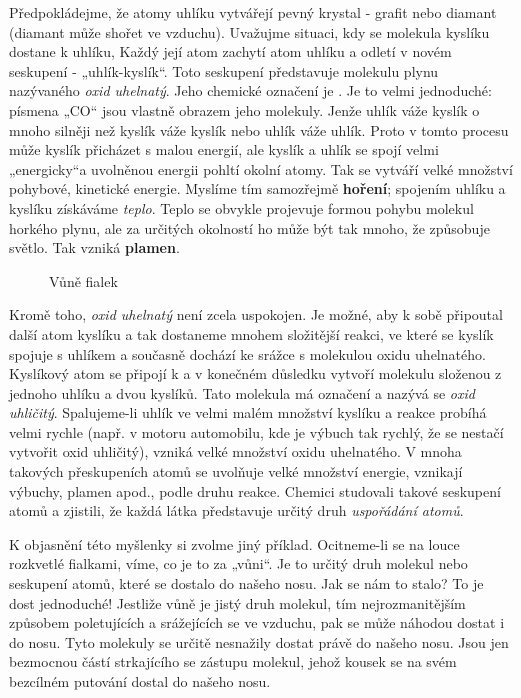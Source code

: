     Předpokládejme, že atomy uhlíku vytvářejí pevný krystal - grafit nebo diamant (diamant může
    shořet ve vzduchu). Uvažujme situaci, kdy se molekula kyslíku dostane k uhlíku, Každý její atom
    zachytí atom uhlíku a odletí v novém seskupení - „uhlík-kyslík“. Toto seskupení představuje
    molekulu plynu nazývaného \emph{oxid uhelnatý}. Jeho chemické označení je . Je to velmi
    jednoduché: písmena „CO“ jsou vlastně obrazem jeho molekuly. Jenže uhlík váže kyslík o mnoho
    silněji než kyslík váže kyslík nebo uhlík váže uhlík. Proto v tomto procesu může kyslík
    přicházet s malou energií, ale kyslík a uhlík se spojí velmi „energicky“a uvolněnou energii
    pohltí okolní atomy. Tak se vytváří velké množství pohybové, kinetické energie. Myslíme tím
    samozřejmě \textbf{hoření}; spojením uhlíku a kyslíku získáváme \emph{teplo}. Teplo se obvykle
    projevuje formou pohybu molekul horkého plynu, ale za určitých okolností ho může být tak mnoho,
    že způsobuje světlo. Tak vzniká \textbf{plamen}.
    
    \begin{figure}[hbt!]    %
      \centering
      \caption{Vůně fialek \cite[s.~24]{Feynman01}}
      \label{fyz:fig015}
    \end{figure}

    Kromě toho, \emph{oxid uhelnatý} není zcela uspokojen. Je možné, aby k sobě připoutal další atom
    kyslíku a tak dostaneme mnohem složitější reakci, ve které se kyslík spojuje s uhlíkem a
    současně dochází ke srážce s molekulou oxidu uhelnatého. Kyslíkový atom se připojí k  a v
    konečném důsledku vytvoří molekulu složenou z jednoho uhlíku a dvou kyslíků. Tato molekula má
    označení  a nazývá se \emph{oxid uhličitý}. Spalujeme-li uhlík ve velmi malém množství
    kyslíku a reakce probíhá velmi rychle (např. v motoru automobilu, kde je výbuch tak rychlý, že
    se nestačí vytvořit oxid uhličitý), vzniká velké množství oxidu uhelnatého. V mnoha takových
    přeskupeních atomů se uvolňuje velké množství energie, vznikají výbuchy, plamen apod., podle
    druhu reakce. Chemici studovali takové seskupení atomů a zjistili, že každá látka představuje
    určitý druh \emph{uspořádání atomů}.

    K objasnění této myšlenky si zvolme jiný příklad. Ocitneme-li se na louce rozkvetlé fialkami,
    víme, co je to za „vůni“. Je to určitý druh molekul nebo seskupení atomů, které se dostalo do
    našeho nosu. Jak se nám to stalo? To je dost jednoduché! Jestliže vůně je jistý druh molekul,
    tím nejrozmanitějším způsobem poletujících a srážejících se ve vzduchu, pak se může náhodou
    dostat i do nosu. Tyto molekuly se určitě nesnažily dostat právě do našeho nosu. Jsou jen
    bezmocnou částí strkajícího se zástupu molekul, jehož kousek se na svém bezcílném putování
    dostal do našeho nosu.      
    
